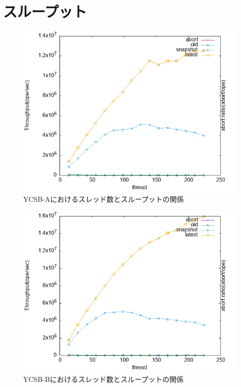 \documentclass[a4paper]{jreport}	%
\begin{document}
\section{スループット}


\begin{figure}[h] 
\centering
\includegraphics[width=15cm]{data/stable/ycsb-a/throughput}
\caption{YCSB-Aにおけるスレッド数とスループットの関係}
\label{fig:throughput-a}
\end{figure}

\begin{figure}[h] 
\centering
\includegraphics[width=15cm]{data/stable/ycsb-b/throughput}
\caption{YCSB-Bにおけるスレッド数とスループットの関係}
\label{fig:throughput-b}
\end{figure}
\end{document}

